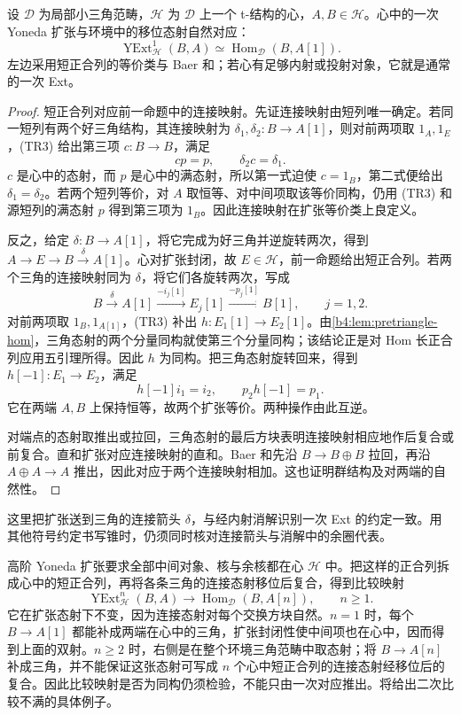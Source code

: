 \begin{proposition}\label{b4:prop:heart-ext1}
	设 \(\mathcal D\) 为局部小三角范畴，\(\mathcal H\) 为 \(\mathcal D\) 上一个 t-结构的心，\(A,B\in\mathcal H\)。心中的一次 Yoneda 扩张与环境中的移位态射自然对应：
	\[
		\operatorname{YExt}_{\mathcal H}^1(B,A) \simeq\operatorname{Hom}_{\mathcal D}(B,A[1]).
	\]
	左边采用短正合列的等价类与 Baer 和；若心有足够内射或投射对象，它就是通常的一次 Ext。
\end{proposition}
\begin{proof}
	短正合列对应前一命题中的连接映射。先证连接映射由短列唯一确定。若同一短列有两个好三角结构，其连接映射为 \(\delta_1,\delta_2:B\to A[1]\)，则对前两项取 \(1_A,1_E\)，(TR3) 给出第三项 \(c:B\to B\)，满足
	\[
		cp=p,\qquad \delta_2c=\delta_1.
	\]
	\(c\) 是心中的态射，而 \(p\) 是心中的满态射，所以第一式迫使 \(c=1_B\)，第二式便给出 \(\delta_1=\delta_2\)。若两个短列等价，对 \(A\) 取恒等、对中间项取该等价同构，仍用 (TR3) 和源短列的满态射 \(p\) 得到第三项为 \(1_B\)。因此连接映射在扩张等价类上良定义。

	反之，给定 \(\delta:B\to A[1]\)，将它完成为好三角并逆旋转两次，得到 \(A\to E\to B\xrightarrow{\delta}A[1]\)。心对扩张封闭，故 \(E\in\mathcal H\)，前一命题给出短正合列。若两个三角的连接映射同为 \(\delta\)，将它们各旋转两次，写成
	\[
		B\xrightarrow{\delta}A[1]\xrightarrow{-i_j[1]}E_j[1] \xrightarrow{-p_j[1]}B[1],\qquad j=1,2.
	\]
	对前两项取 \(1_B,1_{A[1]}\)，(TR3) 补出 \(h:E_1[1]\to E_2[1]\)。由\cref{b4:lem:pretriangle-hom}，三角态射的两个分量同构就使第三个分量同构；该结论正是对 Hom 长正合列应用五引理所得。因此 \(h\) 为同构。把三角态射旋转回来，得到 \(h[-1]:E_1\to E_2\)，满足
	\[
		h[-1]i_1=i_2,\qquad p_2h[-1]=p_1.
	\]
	它在两端 \(A,B\) 上保持恒等，故两个扩张等价。两种操作由此互逆。

	对端点的态射取推出或拉回，三角态射的最后方块表明连接映射相应地作后复合或前复合。直和扩张对应连接映射的直和。Baer 和先沿 \(B\to B\oplus B\) 拉回，再沿 \(A\oplus A\to A\) 推出，因此对应于两个连接映射相加。这也证明群结构及对两端的自然性。
\end{proof}

这里把扩张送到三角的连接箭头 \(\delta\)，与经内射消解识别一次 Ext 的约定一致。用其他符号约定书写锥时，仍须同时核对连接箭头与消解中的余圈代表。

\ProseParagraphBreak
高阶 Yoneda 扩张要求全部中间对象、核与余核都在心 \(\mathcal H\) 中。把这样的正合列拆成心中的短正合列，再将各条三角的连接态射移位后复合，得到比较映射
\[
	\operatorname{YExt}_{\mathcal H}^n(B,A) \longrightarrow\operatorname{Hom}_{\mathcal D}(B,A[n]),\qquad n\ge1.
\]
它在扩张态射下不变，因为连接态射对每个交换方块自然。\(n=1\) 时，每个 \(B\to A[1]\) 都能补成两端在心中的三角，扩张封闭性使中间项也在心中，因而得到上面的双射。\(n\ge2\) 时，右侧是在整个环境三角范畴中取态射；将 \(B\to A[n]\) 补成三角，并不能保证这张态射可写成 \(n\) 个心中短正合列的连接态射经移位后的复合。因此比较映射是否为同构仍须检验，不能只由一次对应推出。将给出二次比较不满的具体例子。

